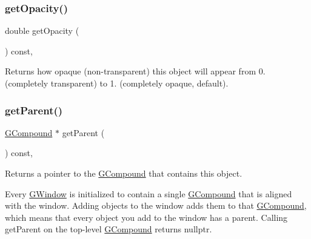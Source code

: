 \subsubsection{\texorpdfstring{get\+Opacity()}{getOpacity()}}
{\footnotesize\ttfamily double get\+Opacity (\begin{DoxyParamCaption}{ }\end{DoxyParamCaption}) const\hspace{0.3cm}{\ttfamily [virtual]}, {\ttfamily [inherited]}}



Returns how opaque (non-\/transparent) this object will appear from 0. (completely transparent) to 1. (completely opaque, default). 

\mbox{\label{classsgl_1_1GObject_a3e53cef70541b1a14eade4ad0984d0b4}} 
\subsubsection{\texorpdfstring{get\+Parent()}{getParent()}}
{\footnotesize\ttfamily \mbox{\hyperlink{classsgl_1_1GCompound}{G\+Compound}} $\ast$ get\+Parent (\begin{DoxyParamCaption}{ }\end{DoxyParamCaption}) const\hspace{0.3cm}{\ttfamily [virtual]}, {\ttfamily [inherited]}}



Returns a pointer to the {\ttfamily \mbox{\hyperlink{classsgl_1_1GCompound}{G\+Compound}}} that contains this object. 

Every {\ttfamily \mbox{\hyperlink{classsgl_1_1GWindow}{G\+Window}}} is initialized to contain a single {\ttfamily \mbox{\hyperlink{classsgl_1_1GCompound}{G\+Compound}}} that is aligned with the window. Adding objects to the window adds them to that {\ttfamily \mbox{\hyperlink{classsgl_1_1GCompound}{G\+Compound}}}, which means that every object you add to the window has a parent. Calling {\ttfamily get\+Parent} on the top-\/level {\ttfamily \mbox{\hyperlink{classsgl_1_1GCompound}{G\+Compound}}} returns {\ttfamily nullptr}. \mbox{\label{classsgl_1_1GObject_a798cc79daaa10145b28f60bcdfdb0ee9}} 
